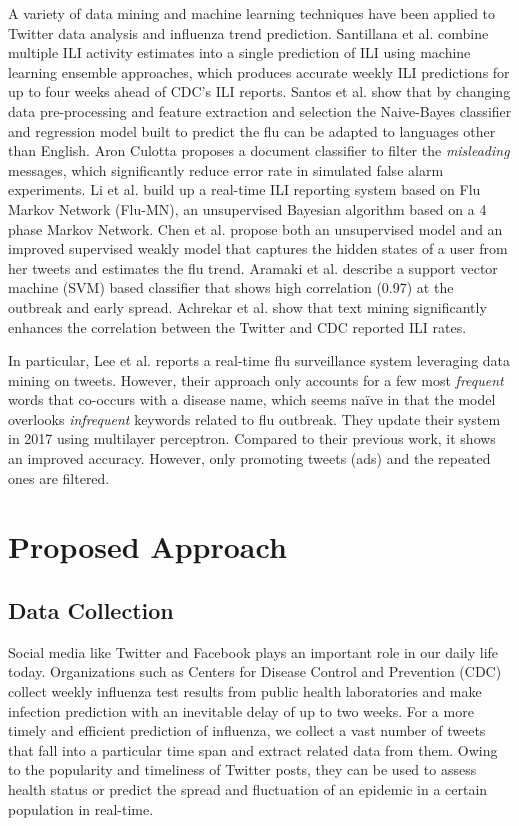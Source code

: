 \documentclass[12pt, oneside]{article}
\begin{document}
A variety of data mining and machine learning techniques have been applied to Twitter data analysis and influenza trend prediction.
Santillana et al. \cite{Santillana} combine multiple ILI activity estimates into a single prediction of ILI using machine learning ensemble approaches,
which produces accurate weekly ILI predictions for up to four weeks ahead of CDC's ILI reports. Santos et al. \cite{Santos} show that by changing data pre-processing and
feature extraction and selection the Naive-Bayes classifier and regression model built to predict the flu can be adapted to languages other than English.
Aron Culotta \cite{Culotta} proposes a document classifier to filter the \textit{misleading} messages, which significantly reduce error rate in simulated false alarm experiments.
Li et al. \cite{Li} build up a real-time ILI reporting system based on Flu Markov Network (Flu-MN), an unsupervised Bayesian algorithm based on a 4 phase Markov Network.
Chen et al. \cite{Chen} propose both an unsupervised model and an improved supervised weakly model that captures the hidden states of a user from her tweets
and estimates the flu trend. Aramaki et al. \cite{Aramaki} describe a support vector machine (SVM) based classifier that shows high correlation (0.97)
at the outbreak and early spread. Achrekar et al. \cite{TwitterSeasonalFlu} show that text mining significantly enhances the correlation between the Twitter and CDC reported ILI rates.

In particular, Lee et al. \cite{TwitterSurveillance} reports a real-time flu surveillance system leveraging data mining on tweets. However, their approach only accounts for
a few most \textit{frequent} words that co-occurs with a disease name, which seems na\"{i}ve in that the model overlooks \textit{infrequent} keywords related to flu outbreak.
They update their system in 2017 \cite{TwitterNNs} using multilayer perceptron. Compared to their previous work, it shows an improved accuracy.
However, only promoting tweets (ads) and the repeated ones are filtered.

\section{Proposed Approach}

\subsection{Data Collection}
\label{subsec:data_collection}

Social media like Twitter and Facebook plays an important role in our daily life today. Organizations such as Centers for Disease Control and Prevention
(CDC) collect weekly influenza test results from public health laboratories and make infection prediction with an inevitable delay of up to two weeks.
For a more timely and efficient prediction of influenza, we collect a vast number of tweets that fall into a particular time span and extract related data
from them. Owing to the popularity and timeliness of Twitter posts, they can be used to assess health status or predict the spread and fluctuation of an epidemic
in a certain population in real-time.
\end{document}
